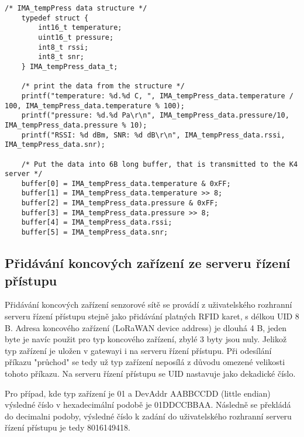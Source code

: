 \begin{lstlisting}[style=CStyle]
    /* IMA_tempPress data structure */   
    typedef struct {
        int16_t temperature;
        uint16_t pressure;
        int8_t rssi;
        int8_t snr;
    } IMA_tempPress_data_t;
     
    /* print the data from the structure */
    printf("temperature: %d.%d C, ", IMA_tempPress_data.temperature / 100, IMA_tempPress_data.temperature % 100);
    printf("pressure: %d.%d Pa\r\n", IMA_tempPress_data.pressure/10, IMA_tempPress_data.pressure % 10);
    printf("RSSI: %d dBm, SNR: %d dB\r\n", IMA_tempPress_data.rssi, IMA_tempPress_data.snr);

    /* Put the data into 6B long buffer, that is transmitted to the K4 server */
    buffer[0] = IMA_tempPress_data.temperature & 0xFF;
    buffer[1] = IMA_tempPress_data.temperature >> 8;
    buffer[2] = IMA_tempPress_data.pressure & 0xFF;
    buffer[3] = IMA_tempPress_data.pressure >> 8;
    buffer[4] = IMA_tempPress_data.rssi;
    buffer[5] = IMA_tempPress_data.snr;
\end{lstlisting}


\subsection{Přidávání koncových zařízení ze serveru řízení přístupu}
Přidávání koncových zařízení senzorové sítě se provádí z uživatelského rozhranní serveru řízení přístupu stejně jako přidávání platných RFID karet, s délkou UID 8 B.
Adresa koncového zařízení (LoRaWAN device address) je dlouhá 4 B, jeden byte je navíc použit pro typ koncového zařízení, zbylé 3 byty jsou nuly.
Jelikož typ zařízení je uložen v gatewayi i na serveru řízení přístupu. Při odesílání příkazu "průchod" se tedy už typ zařízení neposílá z důvodu omezené velikosti tohoto příkazu.
Na serveru řízení přístupu se UID nastavuje jako dekadické číslo.

Pro případ, kde typ zařízení je 01 a DevAddr AABBCCDD (little endian) výsledné číslo v hexadecimální podobě je 01DDCCBBAA. Následně se překládá do decimalni podoby, výsledné číslo k zadání do uživatelského rozhranní serveru řízení přístupu je tedy 8016149418.







